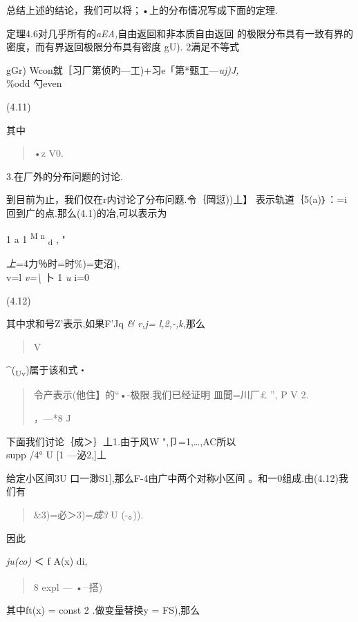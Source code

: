 \documentclass{article}
\begin{document}
总结上述的结论，我们可以将；•上的分布情况写成下面的定理.

定理4.6对几乎所有的\emph{aEA,}自由返回和非本质自由返回
的极限分布具有一致有界的密度，而有界返回极限分布具有密度 gU).
2满足不等式

gGr) Wcon就［习厂第侦旳---工)+习e「第*甄工---\emph{uj)J,\\
}\%odd 勺even

(4.11)

其中

\begin{quote}
•z V0.
\end{quote}

3.在厂外的分布问题的讨论.

到目前为止，我们仅在r内讨论了分布问题.令｛岡愆))丄】
表示轨道｛5(a)｝：=i回到广的点.那么(4.1)的冶,可以表示为

1 a 1 \textsuperscript{M n} \textsubscript{d} , "

\emph{上}=4力％时=时\%)=吏沼),\\
v=l \emph{v=\textbackslash{}} 卜 1 \emph{u} i=0

(4.12)

其中求和号Z'表示,如果F'Jq \emph{\& r,j= l,2,-,k,}那么

\begin{quote}
V
\end{quote}

\^{}(\textsubscript{Uv})属于该和式・

\begin{quote}
令产表示(他住】的``•-极限.我们已经证明 皿聞=川厂£ '', P V 2.

，---*8 J
\end{quote}

下面我们讨论｛成＞｝丄1.由于风W ",卩=1,\ldots{},AC所以\\
supp /4° U {[}1 ---泌2,{]}丄

给定小区间3U 口一渺S1{]},那么F-4由广中两个对称小区间
。和一0组成.由(4.12)我们有

\begin{quote}
\&3)=必＞3)=\emph{成3} U (-。)).
\end{quote}

因此

\emph{ju(co)} ＜ f A(x) di,

\begin{quote}
8 expl --- •\textbar{}\textsuperscript{\_}搭)
\end{quote}

其中ft(x) = const 2 .做变量替换y = FS),那么
\end{document}
